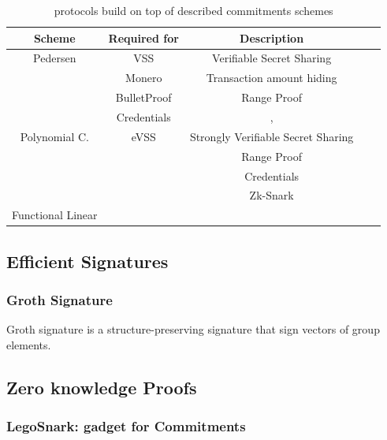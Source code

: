 \documentclass[11pt]{llncs2e/llncs}
\begin{document}
 
\begin{table}
\begin{center}
 \begin{tabular}{ |c| c|c|c|c|}
  \hline
  Scheme & Required for & Description \\
  \hline\hline
  Pedersen & VSS& Verifiable Secret Sharing\\
           & Monero & Transaction amount hiding \\
           & BulletProof & Range Proof \\
           & Credentials & \cite{LCKO21}, \cite{ElkhiyaouiCA21} \\
  \hline
  Polynomial C. & eVSS& Strongly Verifiable Secret Sharing \\
                & & Range Proof\\
                & & Credentials \\
                & & Zk-Snark \\
  \hline
  Functional Linear & & \\
  \hline
  
  \hline
 \end{tabular}
 \end{center}
 \caption{protocols build on top of described commitments schemes}
 \label{tab-usecommit}
\end{table}
 
\subsection{Efficient Signatures}

\subsubsection{Groth Signature}
Groth signature \cite{SigGroth} is a structure-preserving signature that sign vectors of group elements.

\subsection{Zero knowledge Proofs}

\subsubsection{LegoSnark: gadget for Commitments}
\end{document}
